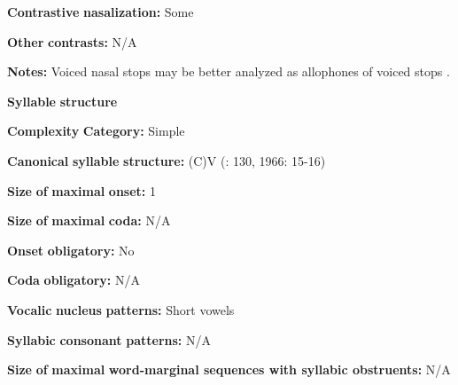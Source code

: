 \begin{styleBody}
\textbf{Contrastive} \textbf{nasalization:} Some
\end{styleBody}

\begin{styleBody}
\textbf{Other} \textbf{contrasts:} N/A
\end{styleBody}

\begin{styleBody}
\textbf{Notes:} Voiced nasal stops may be better analyzed as allophones of voiced stops \citep[176]{Newman1986}.
\end{styleBody}

\begin{styleBody}
\textbf{Syllable} \textbf{structure}
\end{styleBody}

\begin{styleBody}
\textbf{Complexity} \textbf{Category:} Simple
\end{styleBody}

\begin{styleBody}
\textbf{Canonical} \textbf{syllable} \textbf{structure:} (C)V (\citealt{Innes1981}: 130, 1966: 15-16)
\end{styleBody}

\begin{styleBody}
\textbf{Size} \textbf{of} \textbf{maximal} \textbf{onset:} 1
\end{styleBody}

\begin{styleBody}
\textbf{Size} \textbf{of} \textbf{maximal} \textbf{coda:} N/A
\end{styleBody}

\begin{styleBody}
\textbf{Onset} \textbf{obligatory:} No
\end{styleBody}

\begin{styleBody}
\textbf{Coda} \textbf{obligatory:} N/A
\end{styleBody}

\begin{styleBody}
\textbf{Vocalic} \textbf{nucleus} \textbf{patterns:} Short vowels
\end{styleBody}

\begin{styleBody}
\textbf{Syllabic} \textbf{consonant} \textbf{patterns:} N/A
\end{styleBody}

\begin{styleBody}
\textbf{Size} \textbf{of} \textbf{maximal} \textbf{word{}-marginal sequences with syllabic obstruents:} N/A
\end{styleBody}

